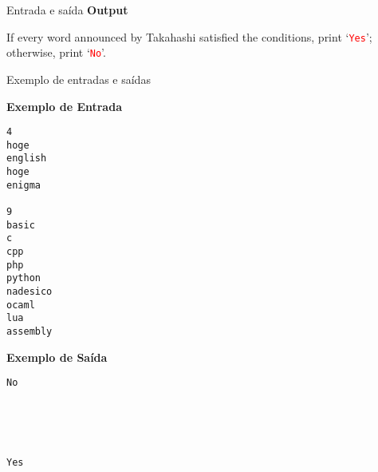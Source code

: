 \begin{frame}[fragile]{Entrada e saída}
\textbf{Output}

If every word announced by Takahashi satisfied the conditions, print `\textcolor{red}{\texttt{Yes}}'; otherwise, print `\textcolor{red}{\texttt{No}}'.

\end{frame}

\begin{frame}[fragile]{Exemplo de entradas e saídas}
\begin{footnotesize}
\begin{minipage}[t]{0.5\textwidth}
\textbf{Exemplo de Entrada}
\begin{verbatim}
4
hoge
english
hoge
enigma

9
basic
c
cpp
php
python
nadesico
ocaml
lua
assembly
\end{verbatim}
\end{minipage}
\begin{minipage}[t]{0.45\textwidth}
\textbf{Exemplo de Saída}
\begin{verbatim}
No





Yes
\end{verbatim}
\end{minipage}
\end{footnotesize}
\end{frame}

